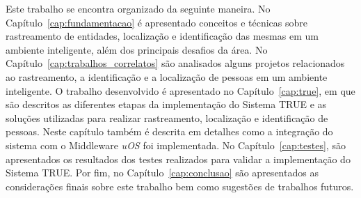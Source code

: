 Este trabalho se encontra organizado da seguinte maneira. No
Capítulo~\ref{cap:fundamentacao} é apresentado conceitos e técnicas sobre
rastreamento de entidades, localização e identificação das mesmas em um ambiente
inteligente, além dos principais desafios da área. No
Capítulo~\ref{cap:trabalhos_correlatos} são analisados alguns projetos
relacionados ao rastreamento, a identificação e a localização de pessoas em um
ambiente inteligente. O trabalho desenvolvido é apresentado no
Capítulo~\ref{cap:true}, em que são descritos as diferentes etapas da
implementação do Sistema TRUE e as soluções utilizadas para realizar
rastreamento, localização e identificação de pessoas. Neste capítulo também é
descrita em detalhes como a integração do sistema com o Middleware \textit{uOS}
foi implementada. No Capítulo~\ref{cap:testes}, são apresentados os resultados
dos testes realizados para validar a implementação do Sistema TRUE. Por fim, no
Capítulo~\ref{cap:conclusao} são apresentados as considerações finais sobre este
trabalho bem como sugestões de trabalhos futuros.


